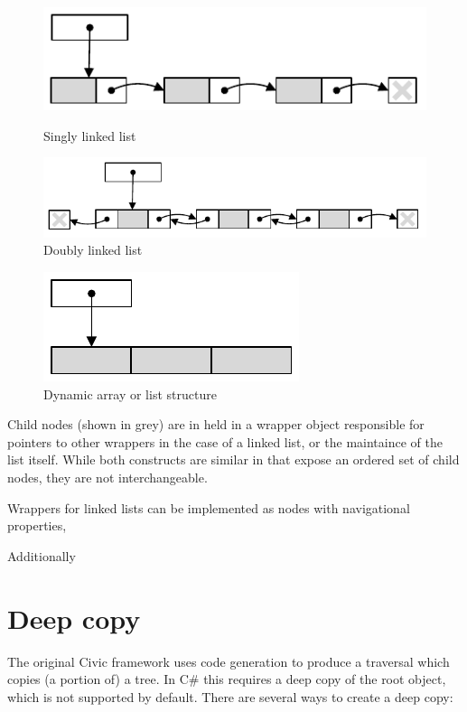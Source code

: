 \documentclass[final,a4paper,12pt]{article}
\begin{document}
\begin{figure}[ht]
	\begin{minipage}[b]{0.45\linewidth}
		\centering
		\includegraphics[width=\textwidth]{sll}
		\caption{Singly linked list}
		\label{fig:sll}
	\end{minipage}
	\hspace{0.5cm}
	\begin{minipage}[b]{0.45\linewidth}
		\centering
		\includegraphics[width=\textwidth]{dll}
		\caption{Doubly linked list}
		\label{fig:dll}
	\end{minipage}
\end{figure}
\begin{figure}[h]
	\centering
	\includegraphics{list}
	\caption{Dynamic array or list structure}
	\label{fig:list}
\end{figure}

Child nodes (shown in grey) are in held in a wrapper object responsible for pointers to other wrappers in the case of a linked list, or the maintaince of the list itself. While both constructs are similar in that expose an ordered set of child nodes, they are not interchangeable.

Wrappers for linked lists can be implemented as nodes with navigational properties, 

Additionally 

\section*{Deep copy}
The original Civic framework uses code generation to produce a traversal which copies (a portion of) a tree. In C\# this requires a deep copy of the root object, which is not supported by default. There are several ways to create a deep copy:
\end{document}
